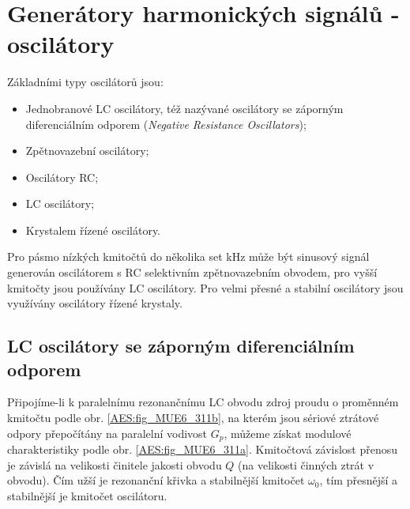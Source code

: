 {  \section{Generátory harmonických signálů - oscilátory}
    Základními typy oscilátorů jsou:
    \begin{itemize}\addtolength{\itemsep}{-0.5\baselineskip}
      \item Jednobranové LC oscilátory, též nazývané oscilátory se záporným diferenciálním odporem 
            (\emph{Negative Resistance Oscillators});
      \item Zpětnovazební oscilátory;
      \item Oscilátory RC;
      \item LC oscilátory;
      \item Krystalem řízené oscilátory.
    \end{itemize}

    Pro pásmo nízkých kmitočtů do několika set kHz může být sinusový signál generován oscilátorem s 
    RC selektivním zpětnovazebním obvodem, pro vyšší kmitočty jsou používány LC oscilátory. Pro 
    velmi přesné a stabilní oscilátory jsou využívány oscilátory řízené krystaly.
    
    \subsection{LC oscilátory se záporným diferenciálním odporem}
      Připojíme-li k paralelnímu rezonančnímu LC obvodu zdroj proudu o proměnném kmitočtu podle 
      obr. \ref{AES:fig_MUE6_311b}, na kterém jsou sériové ztrátové odpory přepočítány na paralelní 
      vodivost \(G_p\), můžeme získat modulové charakteristiky podle obr. \ref{AES:fig_MUE6_311a}. 
      Kmitočtová závislost přenosu je závislá na velikosti činitele jakosti obvodu \(Q\) (na 
      velikosti činných ztrát v obvodu). Čím užší je rezonanční křivka a stabilnější kmitočet 
      \(\omega_0\), tím přesnější a stabilnější je kmitočet oscilátoru.

}
